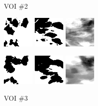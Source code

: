 \documentclass[journal]{IEEEtran}
\begin{document}
\begin{figure}[!htb]
  {\fontsize{9}{9}\selectfont VOI \#2} \vspace{1mm}

   \includegraphics[width=0.14\textwidth]
  {figure/all/dataset_7/roi_coronal}
  \includegraphics[width=0.14\textwidth]
  {figure/all/dataset_7/roi_saggital}
  \includegraphics[width=0.14\textwidth]
  {figure/all/dataset_7/proj_roi}

  \includegraphics[width=0.14\textwidth]
  {figure/all/dataset_7/model_coronal}
  \includegraphics[width=0.14\textwidth]
  {figure/all/dataset_7/model_saggital}
  \includegraphics[width=0.14\textwidth]
  {figure/all/dataset_7/proj_roi_inten10}

  {\fontsize{9}{9}\selectfont VOI \#3} \vspace{1mm}


\end{figure}
\end{document}
